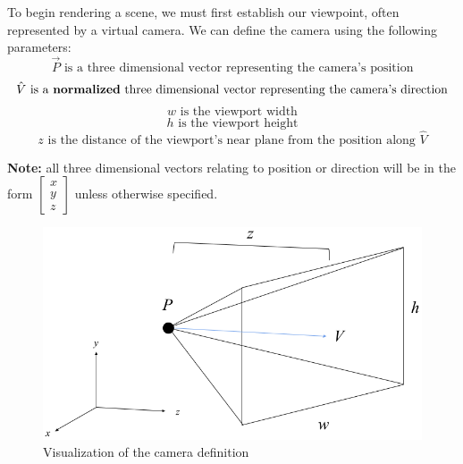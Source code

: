 To begin rendering a scene, we must first establish our viewpoint, often represented by a virtual camera. We can define the camera using the following parameters: 
$$\Vec{P} \text{ is a three dimensional vector representing the camera's position}$$
$$\hat{V} \text{ is a \textbf{normalized} three dimensional vector representing the camera's direction}$$
$$ w \text{ is the viewport width} $$
$$ h \text{ is the viewport height} $$
$$ z \text{ is the distance of the viewport's near plane from the position along $\hat{V}$}$$

\begin{tcolorbox}
   \textbf{Note:} all three dimensional vectors relating to position or direction will be in the form $\begin{bmatrix} x \\ y \\ z \end{bmatrix}$ unless otherwise specified.
\end{tcolorbox}

\begin{figure}[h]
    \centering
    \includegraphics[scale=0.4]{figures/CameraDefinition.png}
    \caption{Visualization of the camera definition}
    \label{fig:camera_def}
\end{figure}